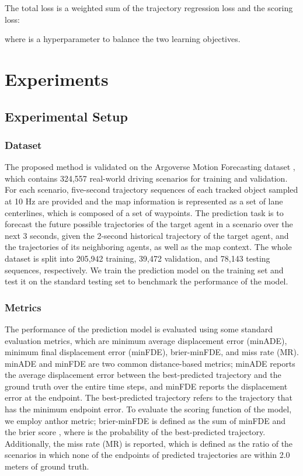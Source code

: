 \documentclass[letterpaper, 10 pt, conference]{ieeeconf}
\begin{document}
The total loss is a weighted sum of the trajectory regression loss and the scoring loss:

where  is a hyperparameter to balance the two learning objectives.

\section{Experiments}
\subsection{Experimental Setup}
\subsubsection{Dataset}
The proposed method is validated on the Argoverse Motion Forecasting dataset \cite{chang2019argoverse}, which contains 324,557 real-world driving scenarios for training and validation. For each scenario, five-second trajectory sequences of each tracked object sampled at 10 Hz are provided and the map information is represented as a set of lane centerlines, which is composed of a set of waypoints. The prediction task is to forecast the future possible trajectories of the target agent in a scenario over the next 3 seconds, given the 2-second historical trajectory of the target agent, and the trajectories of its neighboring agents, as well as the map context. The whole dataset is split into 205,942 training, 39,472 validation, and 78,143 testing sequences, respectively. We train the prediction model on the training set and test it on the standard testing set to benchmark the performance of the model.

\subsubsection{Metrics}
The performance of the prediction model is evaluated using some standard evaluation metrics, which are minimum average displacement error (minADE), minimum final displacement error (minFDE), brier-minFDE, and miss rate (MR). minADE and minFDE are two common distance-based metrics; minADE reports the average displacement error between the best-predicted trajectory and the ground truth over the entire time steps, and minFDE reports the displacement error at the endpoint. The best-predicted trajectory refers to the trajectory that has the minimum endpoint error. To evaluate the scoring function of the model, we employ anthor metric; brier-minFDE is defined as the sum of minFDE and the brier score , where  is the probability of the best-predicted trajectory. Additionally, the miss rate (MR) is reported, which is defined as the ratio of the scenarios in which none of the endpoints of predicted trajectories are within 2.0 meters of ground truth.
\end{document}
